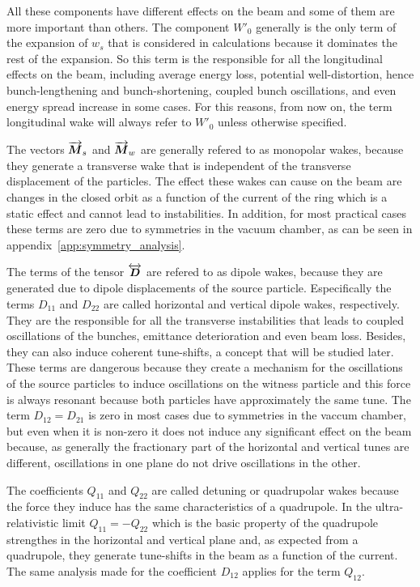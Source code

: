 \documentclass[
	12pt,				%
	openright,			%
	oneside,			%
	a4paper,		%
	chapter=TITLE,		%
	section=TITLE,		%
    brazil,				%
	english,			%
	sumario=tradicional,
	]{abntex2}
\begin{document}
  All these components have different effects on the beam and some of them are more important than others. The component $W'_0$ generally is the only term of the expansion of $w_s$ that is considered in calculations because it dominates the rest of the expansion. So this term is the responsible for all the longitudinal effects on the beam, including average energy loss, potential well-distortion, hence bunch-lengthening and bunch-shortening, coupled bunch oscillations, and even energy spread increase in some cases. For this reasons, from now on, the term longitudinal wake will always refer to $W'_0$ unless otherwise specified.

  The vectors $\overrightarrow{\boldsymbol{M}}_s$ and $\overrightarrow{\boldsymbol{M}}_w$ are generally refered to as monopolar wakes, because they generate a transverse wake that is independent of the transverse displacement of the particles. The effect these wakes can cause on the beam are changes in the closed orbit as a function of the current of the ring which is a static effect and cannot lead to instabilities. In addition, for most practical cases these terms are zero due to symmetries in the vacuum chamber, as can be seen in appendix~\ref{app:symmetry_analysis}.

  The terms of the tensor $\overleftrightarrow{\boldsymbol{D}}$ are refered to as dipole wakes, because they are generated due to dipole displacements of the source particle. Especifically the terms $D_{11}$ and $D_{22}$ are called horizontal and vertical dipole wakes, respectively. They are the responsible for all the transverse instabilities that leads to coupled oscillations of the bunches, emittance deterioration and even beam loss. Besides, they can also induce coherent tune-shifts, a concept that will be studied later. These terms are dangerous because they create a mechanism for the oscillations of the source particles to induce oscillations on the witness particle and this force is always resonant because both particles have approximately the same tune. The term $D_{12}=D_{21}$ is zero in most cases due to symmetries in the vaccum chamber, but even when it is non-zero it does not induce any significant effect on the beam because, as generally the fractionary part of the horizontal and vertical tunes are different, oscillations in one plane do not drive oscillations in the other.

  The coefficients $Q_{11}$ and $Q_{22}$ are called detuning or quadrupolar wakes because the force they induce has the same characteristics of a quadrupole. In the ultra-relativistic limit $Q_{11}=-Q_{22}$ which is the basic property of the quadrupole strengthes in the horizontal and vertical plane and, as expected from a quadrupole, they generate tune-shifts in the beam as a function of the current. The same analysis made for the coefficient $D_{12}$ applies for the term $Q_{12}$.
\end{document}
